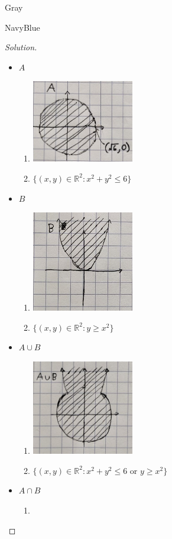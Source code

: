 \documentclass[12pt]{amsart}
\theoremstyle{named}
\newenvironment{soln}
{\begin{color}{Gray}\begin{framed}\begin{color}{NavyBlue}\begin{proof}[Solution]
\doublespacing}
{\end{proof}\end{color}\end{framed}\end{color}}
\theoremstyle{definition}
\begin{document}
\begin{soln}
    \phantom{ }
	\begin{itemize}
        \item $A$
		\begin{enumerate}
			\item \phantom{ }
			
			\includegraphics[width=12em]{media/A.png}
			\item $\{(x,y) \in \mathbb R^2 : x^2 + y^2 \leq 6\}$
		\end{enumerate}
	    \item $B$
	    \begin{enumerate}
			\item \phantom{ }
			
			\includegraphics[width=12em]{media/B.png}
			\item $\{(x,y) \in \mathbb R^2 : y \geq x^2\}$
		\end{enumerate}

		\phantom{ }

	    \item $A \cup B$
	    \begin{enumerate}
			\item \phantom{ }
			
			\includegraphics[width=12em]{media/A_cup_B.png}
			\item $\{(x,y) \in \mathbb R^2 : x^2 + y^2 \leq 6 \text{ or } y \geq x^2\}$
		\end{enumerate}
	    \item $A \cap B$
	    \begin{enumerate}
			\item \phantom{ }
			

\end{enumerate}
\end{itemize}
\end{soln}
\end{document}
